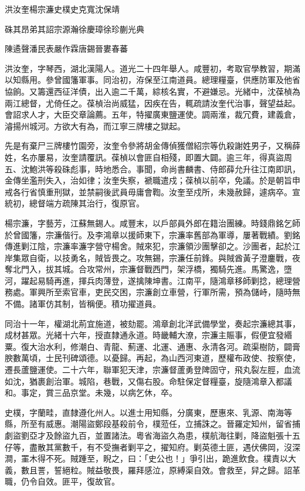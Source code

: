 
\begin{pinyinscope}
洪汝奎楊宗濂史樸史克寬沈保靖

硃其昂弟其詔宗源瀚徐慶璋徐珍蒯光典

陳遹聲潘民表嚴作霖唐錫晉婁春蕃

洪汝奎，字琴西，湖北漢陽人。道光二十四年舉人。咸豐初，考取官學教習，期滿以知縣用。參曾國籓軍事。同治初，洊保至江南道員。總理糧臺，供應防軍及他省協餉。又籌還西征洋債，出入逾二千萬，綜核名實，不避嫌忌。光緒中，沈葆楨為兩江總督，尤倚任之。葆楨治尚威猛，因疾在告，輒疏請汝奎代治事，聲望益起。會詔求人才，大臣交章論薦。五年，特擢廣東鹽運使。調兩淮，裁冗費，建義倉，濬揚州城河。方欲大有為，而江寧三牌樓之獄起。

先是有棄尸三牌樓竹園旁，汝奎令參將胡金傳偵獲僧紹宗等仇殺謝姓男子，又稱薛姓，名亦屢易，汝奎請覆訊。葆楨以會匪自相殘，即置大闢。逾三年，得真盜周五、沈鮑洪等殺硃彪事，時地悉合。事聞，命尚書麟書、侍郎薛允升往江南即訊，金傳坐濫刑失入，治如律；汝奎失察，褫職遣戍；葆楨以前卒，免議。於是朝旨申戒各行省慎重刑獄，並禁嗣後武員毋庸會鞫。汝奎至戍所，未幾赦歸，遽病卒。宣統初，總督端方疏陳其治行，復原官。

楊宗濂，字藝芳，江蘇無錫人。咸豐末，以戶部員外郎在籍治團練。時錢鼎銘乞師於曾國籓，宗濂偕行。及李鴻章以援師東下，宗濂率舊部為軍導，屢著戰績。劉銘傳進剿江陰，宗濂率濂字營守楊舍。賊來犯，宗濂領沙團擊卻之。沙團者，起於江岸集眾自衛，以技勇名，賊皆畏之。攻無錫，宗濂任前鋒。與賊酋黃子澄鏖戰，夜奪北門入，拔其城。合攻常州，宗濂督戰西門，架浮橋，獨騎先進。馬驚逸，墮河，躍起易騎再進，揮兵肉薄登，遂擒陳坤書。江南平，隨鴻章移師剿捻，總理營務處。軍興所至索官車，吏民交困，宗濂創立車營，行軍所需，預為儲峙，隨時無不備。諸軍仿其制，皆稱便。積功擢道員。

同治十一年，權湖北荊宜施道，被劾罷。鴻章創北洋武備學堂，奏起宗濂總其事，成材甚眾。光緒十六年，授直隸通永道。時畿輔大潦，宗濂主賑事，假便宜發緡粟。復大治水利，修潮白、青龍、薊運、北運、通惠、永清各河。疏渠樹防，闢膏腴數萬頃，士民刊碑頌德。以憂歸。再起，為山西河東道，歷權布政使、按察使，遷長蘆鹽運使。二十六年，聯軍犯天津，宗濂督蘆勇登陴固守，飛丸裂左脛，血流如沈，猶裹創治軍。城陷，巷戰，又傷右股。命駐保定督糧臺，旋隨鴻章入都議和。事定，賞三品京堂。未幾，以病乞休，卒。

史樸，字蘭畦，直隸遵化州人。以進士用知縣，分廣東，歷惠來、乳源、南海等縣，所至有威惠。潮陽盜鄭段基殺前令，樸蒞任，立捕誅之。晉羅定知州，留省捕劇盜劉亞才及餘盜九百，並置諸法。粵省海盜久為患，樸航海往剿，降盜魁張十五仔等，盡散其黨數千，有不受撫者剿平之，擢知府。剿英德土匪，遇伏佛岡，沒深澗，罣木得不死。賊踵至，睨之，曰：「史公也！」爭引出，跪進飲食。樸責以大義，數且詈，誓絕粒。賊益敬畏，羅拜感泣，原縛渠自效。會救至，舁之歸。詔革職，仍令自效。匪平，復故官。


\end{pinyinscope}
